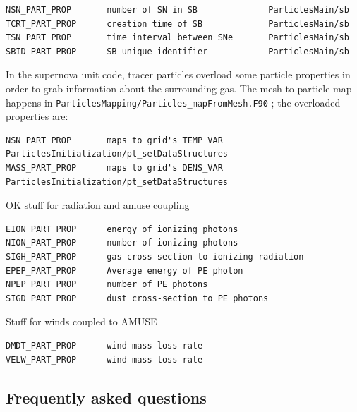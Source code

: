 \documentclass[10pt]{article}
\begin{document}
\begin{verbatim}
NSN_PART_PROP       number of SN in SB              ParticlesMain/sb
TCRT_PART_PROP      creation time of SB             ParticlesMain/sb
TSN_PART_PROP       time interval between SNe       ParticlesMain/sb
SBID_PART_PROP      SB unique identifier            ParticlesMain/sb
\end{verbatim}

In the supernova unit code, tracer particles overload some particle properties
in order to grab information about the surrounding gas.
The mesh-to-particle map happens in
\texttt{ParticlesMapping/Particles\_mapFromMesh.F90} ; the overloaded
properties are:

\begin{verbatim}
NSN_PART_PROP       maps to grid's TEMP_VAR        ParticlesInitialization/pt_setDataStructures
MASS_PART_PROP      maps to grid's DENS_VAR        ParticlesInitialization/pt_setDataStructures
\end{verbatim}

OK stuff for radiation and amuse coupling

\begin{verbatim}
EION_PART_PROP      energy of ionizing photons
NION_PART_PROP      number of ionizing photons
SIGH_PART_PROP      gas cross-section to ionizing radiation
EPEP_PART_PROP      Average energy of PE photon
NPEP_PART_PROP      number of PE photons
SIGD_PART_PROP      dust cross-section to PE photons
\end{verbatim}

Stuff for winds coupled to AMUSE

\begin{verbatim}
DMDT_PART_PROP      wind mass loss rate
VELW_PART_PROP      wind mass loss rate
\end{verbatim}


\subsection{Frequently asked questions}
\end{document}
